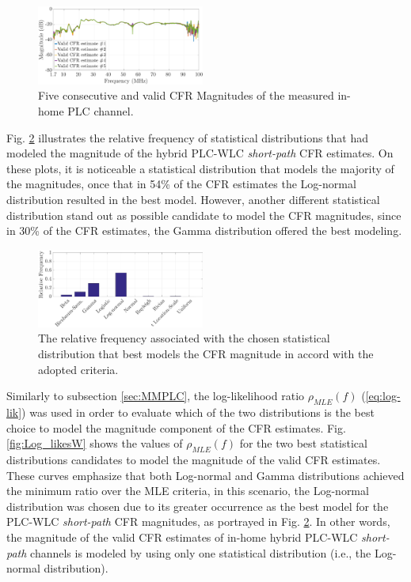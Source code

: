 \documentclass[journal]{IEEEtran}
\begin{document}
\begin{figure}[h]
	\centering
	\includegraphics[width=0.49\textwidth]{images/respfreqsW.eps}
	\caption{Five consecutive and valid CFR Magnitudes of the measured in-home PLC channel.}
	\label{respfreqsW}
\end{figure}

Fig. \ref{MAG_percentsW} illustrates the relative frequency of statistical distributions that had modeled the magnitude of the hybrid \ac{PLC}-\ac{WLC} \textit{short-path} \ac{CFR} estimates. On these plots, it is noticeable a statistical distribution that models the majority of the magnitudes, once that in 54\% of the \ac{CFR} estimates the Log-normal distribution resulted in the best model. However, another different statistical distribution stand out as possible candidate to model the \ac{CFR} magnitudes, since in 30\% of the \ac{CFR} estimates, the Gamma distribution offered the best modeling. 

\begin{figure}[h!]
	\centering
	\includegraphics[width=0.49\textwidth]{images/MAG_percentsW.eps}
	\caption{The relative frequency associated with the chosen statistical distribution that best models the CFR magnitude in accord with the adopted criteria.}
	\label{MAG_percentsW}
\end{figure}

Similarly to subsection \ref{sec:MMPLC}, the log-likelihood ratio $\rho_{MLE} (f)$ (\ref{eq:log-lik}) was used in order to evaluate which of the two distributions is the best choice to model the magnitude component of the \ac{CFR} estimates. Fig. \ref{fig:Log_likesW} shows the values of  $\rho_{MLE}(f)$ for the two best statistical distributions candidates to model the magnitude of the valid \ac{CFR} estimates. These curves emphasize that both Log-normal and Gamma distributions achieved the minimum ratio over the \ac{MLE} criteria, in this scenario, the Log-normal distribution was chosen due to its greater occurrence as the best model for the \ac{PLC}-\ac{WLC} \textit{short-path} \ac{CFR} magnitudes, as portrayed in Fig. \ref{MAG_percentsW}. In other words, the magnitude of the valid \ac{CFR} estimates of in-home hybrid \ac{PLC}-\ac{WLC} \textit{short-path} channels is modeled by using only one statistical distribution (i.e., the Log-normal distribution).
\end{document}
